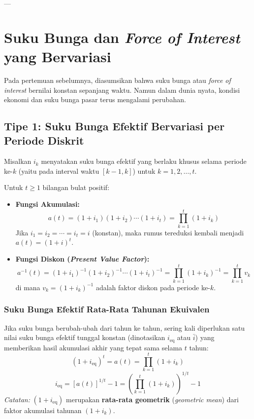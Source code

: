 \documentclass[11pt,a4paper]{article}
\begin{document}
---

\section{Suku Bunga dan \textit{Force of Interest} yang Bervariasi}

Pada pertemuan sebelumnya, diasumsikan bahwa suku bunga atau \textit{force of interest} bernilai konstan sepanjang waktu. Namun dalam dunia nyata, kondisi ekonomi dan suku bunga pasar terus mengalami perubahan.

\subsection{Tipe 1: Suku Bunga Efektif Bervariasi per Periode Diskrit}

Misalkan $i_k$ menyatakan suku bunga efektif yang berlaku khusus selama periode ke-$k$ (yaitu pada interval waktu $[k-1, k]$) untuk $k = 1, 2, \dots, t$.

\begin{definitionbox}
Untuk $t \ge 1$ bilangan bulat positif:
\begin{itemize}[leftmargin=1.5em]
    \item \textbf{Fungsi Akumulasi:}
    \begin{equation}
        a(t) = (1 + i_1)(1 + i_2)\cdots(1 + i_t) = \prod_{k=1}^t (1 + i_k)
    \end{equation}
    Jika $i_1 = i_2 = \cdots = i_t = i$ (konstan), maka rumus tereduksi kembali menjadi $a(t) = (1 + i)^t$.
    
    \item \textbf{Fungsi Diskon (\textit{Present Value Factor}):}
    \begin{equation}
        a^{-1}(t) = (1 + i_1)^{-1}(1 + i_2)^{-1}\cdots(1 + i_t)^{-1} = \prod_{k=1}^t (1 + i_k)^{-1} = \prod_{k=1}^t v_k
    \end{equation}
    di mana $v_k = (1 + i_k)^{-1}$ adalah faktor diskon pada periode ke-$k$.
\end{itemize}
\end{definitionbox}

\subsubsection{Suku Bunga Efektif Rata-Rata Tahunan Ekuivalen}
Jika suku bunga berubah-ubah dari tahun ke tahun, sering kali diperlukan satu nilai suku bunga efektif tunggal konstan (dinotasikan $i_{\text{eq}}$ atau $\bar{i}$) yang memberikan hasil akumulasi akhir yang tepat sama selama $t$ tahun:
\begin{equation}
    (1 + i_{\text{eq}})^t = a(t) = \prod_{k=1}^t (1 + i_k)
\end{equation}
\begin{equation}
    i_{\text{eq}} = [a(t)]^{1/t} - 1 = \left( \prod_{k=1}^t (1 + i_k) \right)^{1/t} - 1
\end{equation}
\textit{Catatan:} $(1 + i_{\text{eq}})$ merupakan \textbf{rata-rata geometrik} (\textit{geometric mean}) dari faktor akumulasi tahunan $(1 + i_k)$.
\end{document}
